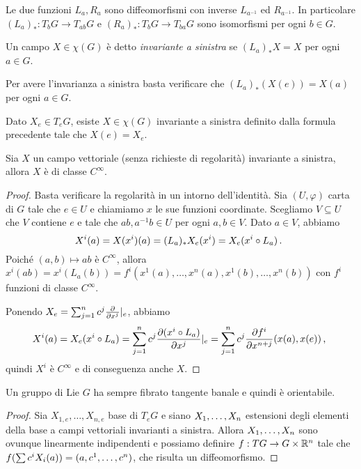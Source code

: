 Le due funzioni $L_a,R_a$ sono diffeomorfismi con inverse $L_{a^{-1}}$ ed $R_{a^{-1}}$.
In particolare $(L_a)_* : T_bG \to T_{ab} G$ e $(R_a)_* : T_bG \to T_{ba} G$ sono isomorfismi per ogni $b\in G$.


\begin{definition} 
	Un campo $X\in\chi(G)$ è detto \emph{invariante a sinistra} se $(L_a)_*X=X$ per ogni $a\in G$.
\end{definition}

\begin{remark}
	Per avere l'invarianza a sinistra basta verificare che $(L_a)_*(X(e)) = X(a)$ per ogni $a\in G$.
\end{remark}

Dato $X_e \in T_eG$, esiste $X\in\chi(G)$ invariante a sinistra definito dalla formula precedente tale che $X(e) = X_e$.


\begin{proposition}
	Sia $X$ un campo vettoriale (senza richieste di regolarità) invariante a sinistra, allora $X$ è di classe $C^\infty$.
\end{proposition}
\begin{proof}
	Basta verificare la regolarità in un intorno dell'identità. Sia $(U,\varphi)$ carta di $G$ tale che $e\in U$ e chiamiamo $x$ le sue funzioni coordinate. Scegliamo $V\subseteq U$ che $V$ contiene $e$ e tale che $a b, a^{-1}b \in U$ per ogni $a,b\in V$.
	Dato $a\in V$, abbiamo 
	\begin{equation*}
	X^i(a) = X(x^i)(a) = (L_a)_* X_e (x^i) = X_e (x^i\circ L_a) \punto
	\end{equation*}
	Poiché $(a,b) \mapsto ab$ è $C^\infty$, allora $x^i(ab) = x^i( L_a(b) ) = f^i(x^1(a),\ldots, x^n(a), x^1(b), \ldots, x^n(b) )$ con $f^i$ funzioni di classe $C^\infty$.
	
	Ponendo $X_e = \sum_{j=1}^n c^j \DerParz{}{x^j}\restrict e$, abbiamo
	\begin{equation*}
	X^i (a) = X_e (x^i \circ L_a) = \sum_{j=1}^n c^j \DerParz{(x^i\circ L_a)}{x^j} \restrict e = 
	\sum_{j=1}^n c^j \DerParz{f^i}{x^{n+j}}(x(a), x(e))\virgola
	\end{equation*}
	quindi $X^i$ è $C^\infty$ e di conseguenza anche $X$.
\end{proof}

\begin{corollary}
	Un gruppo di Lie $G$ ha sempre fibrato tangente banale e quindi è orientabile.
\end{corollary}
\begin{proof}
	Sia $X_{1,e},\ldots,X_{n,e}$ base di $T_eG$ e siano $\seqb Xn,$ estensioni degli elementi della base a campi vettoriali invarianti a sinistra. Allora $\seqb Xn,$ sono ovunque linearmente indipendenti e possiamo definire $f:TG \to G\times \R^n$ tale che $f(\sum c^iX_i(a)) = (a,\seqa cn,)$, che risulta un diffeomorfismo.
\end{proof}

